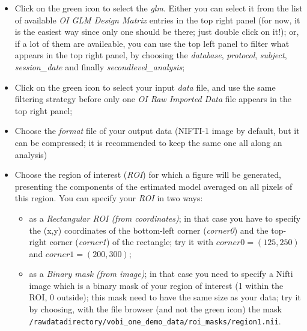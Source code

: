 \begin{itemize}
  \item Click on the green icon to select the \textit{glm}. Either you can select it from the list of available \textit{OI GLM Design Matrix} entries in the top right panel (for now, it is the easiest way since only one should be there; just double click on it!); or, if a lot of them are availeable, you can use the top left panel to filter what appears in the top right panel, by choosing the  \textit{database}, \textit{protocol}, \textit{subject}, \textit{session\_date} and finally \textit{secondlevel\_analysis};
  \item Click on the green icon to select your input \textit{data} file, and use the same filtering strategy before only one \textit{OI Raw Imported Data} file appears in the top right panel;
  \item Choose the \textit{format} file of your output data (NIFTI-1 image by default, but it can be compressed; it is recommended to keep the same one all along an analysis)
  \item Choose the region of interest (\textit{ROI}) for which a figure will be generated, presenting the components of the estimated model averaged on all pixels of this region. You can specify your \textit{ROI} in two ways:

   \begin{itemize}
     \item as a \textit{Rectangular ROI (from coordinates)}; in that case you have to specify the (x,y) coordinates of the bottom-left  corner (\textit{corner0}) and the top-right corner (\textit{corner1}) of the rectangle; try it with $corner0 = (125,250)$ and $corner1 = (200,300)$;
     \item as a \textit{Binary mask (from image)}; in that case you need to specify a Nifti image which is a binary mask of your region of interest (1 within the ROI, 0 outside); this mask need to have the same size as your data; try it by choosing, with the file browser (and not the green icon) the mask \\
     \texttt{/rawdatadirectory/vobi\_one\_demo\_data/roi\_masks/region1.nii}.
   \end{itemize}

\end{itemize}


